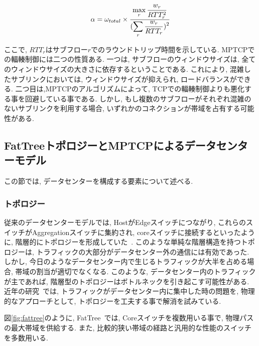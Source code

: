\documentclass[10pt, a4paper, twocolumn]{jsarticle}
\begin{document}
\vspace{-2mm}
\begin{eqnarray}
 \alpha = \omega_{total} \times
\frac{\displaystyle \max_{r} \frac{w_r}{RTT^2_r}}{\displaystyle
(\sum_{r}\frac{w_r}{RTT_r})^2}
\label{alpha}
\vspace{-2mm}
\end{eqnarray}

ここで, $RTT_r$はサブフロー$r$でのラウンドトリップ時間を示している.
MPTCPでの輻輳制御には二つの性質ある.
一つは, サブフローのウィンドウサイズは, 全てのウィンドウサイズの大きさに依存するということである.
これにより, 混雑したサブリンクにおいては, ウィンドウサイズが抑えられ, ロードバランスができる.
二つ目は,MPTCPのアルゴリズムによって, TCPでの輻輳制御よりも悪化する事を回避している事である.
しかし, もし複数のサブフローがそれぞれ混雑のないサブリンクを利用する場合, いずれかのコネクションが帯域を占有する可能性がある.

\subsection{FatTreeトポロジーとMPTCPによるデータセンターモデル}
\label{sec:fattree}
この節では, データセンターを構成する要素について述べる.
\subsubsection{トポロジー}
\label{subsec:topology}
従来のデータセンターモデルでは, HostがEdgeスイッチにつながり,
これらのスイッチがAggregationスイッチに集約され,
coreスイッチに接続するといったように, 階層的にトポロジーを形成していた~\cite{fattree}.
このような単純な階層構造を持つトポロジーは, トラフィックの大部分がデータセンター外の通信には有効であった.
しかし, 今日のようなデータセンター内で生じるトラフィックが大半を占める場合, 帯域の割当が適切でなくなる.
このような, データセンター内のトラフィックが主であれば, 階層型のトポロジーはボトルネックを引き起こす可能性がある.
近年の研究~\cite{fattree,bcube,vl2}では, トラフィックがデータセンター内に集中した時の問題を, 物理的なアプローチとして,
トポロジーを工夫する事で解消を試みている.

図\ref{fig:fattree}のように, FatTree~\cite{fattree}では, Coreスイッチを複数用いる事で,
物理パスの最大帯域を供給する.
また, 比較的狭い帯域の経路と汎用的な性能のスイッチを多数用いる.
\end{document}
